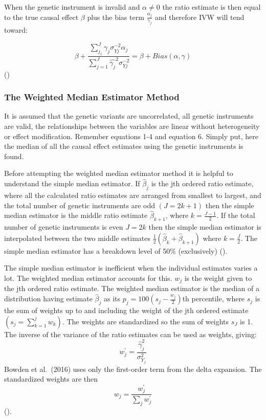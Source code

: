 \documentclass[
]{article}
\begin{document}
When the genetic instrument is invalid and \(\alpha\ne0\) the ratio
estimate is then equal to the true causal effect \(\beta\) plus the bias
term \(\frac{\alpha_j}{\gamma_j}\) and therefore IVW will tend toward:

\[\beta+\frac{\sum_{j_1}^{J}\gamma_j\sigma_{Yj}^{-2}\alpha_j}{\sum_{j=1}^{J}\hat{\gamma_j}^2\sigma_{Yj}^{-2}}=\beta+Bias(\alpha,\gamma)\tag{8}\]
()

\subsubsection{\texorpdfstring{\textbf{The Weighted Median Estimator
Method}}{The Weighted Median Estimator Method}}\label{the-weighted-median-estimator-method}

It is assumed that the genetic variants are uncorrelated, all genetic
instruments are valid, the relationships between the variables are
linear without heterogeneity or effect modification. Remember equations
1-4 and equation 6. Simply put, here the median of all the causal effect
estimates using the genetic instruments is found.

Before attempting the weighted median estimator method it is helpful to
understand the simple median estimator. If \(\hat{\beta}_j\) is the jth
ordered ratio estimate, where all the calculated ratio estimates are
arranged from smallest to largest, and the total number of genetic
instruments are odd \((J=2k+1)\) then the simple median estimator is the
middle ratio estimate \(\hat{\beta}_{k+1}\), where \(k=\frac{J-1}{2}\).
If the total number of genetic instruments is even \(J=2k\) then the
simple median estimator is interpolated between the two middle estimates
\(\frac{1}{2}(\hat{\beta}_{k}+\hat{\beta}_{k+1})\) where
\(k=\frac{J}{2}\). The simple median estimator has a breakdown level of
50\% (exclusively) ().

The simple median estimator is inefficient when the individual estimates
varies a lot. The weighted median estimator accounts for this. \(w_j\)
is the weight given to the jth ordered ratio estimate. The weighted
median estimator is the median of a distribution having estimate
\(\hat{\beta}_j\) as its \(p_j=100(s_j-\frac{w_j}{2})\)th percentile,
where \(s_j\) is the sum of weights up to and including the weight of
the jth ordered estimate \((s_j=\sum_{k=1}^{j}w_k)\). The weights are
standardized so the sum of weights \(s_J\) is 1. The inverse of the
variance of the ratio estimates can be used as weights, giving:
\[w^{'}_j=\frac{\hat{\gamma}^2_j}{\sigma^2_{Y_j}}\tag{9}\] Bowden et
al.~(2016) uses only the first-order term from the delta expansion. The
standardized weights are then
\[w_j=\frac{w_j^{'}}{\sum_jw_j^{'}}\tag{10}\]
().
\end{document}
